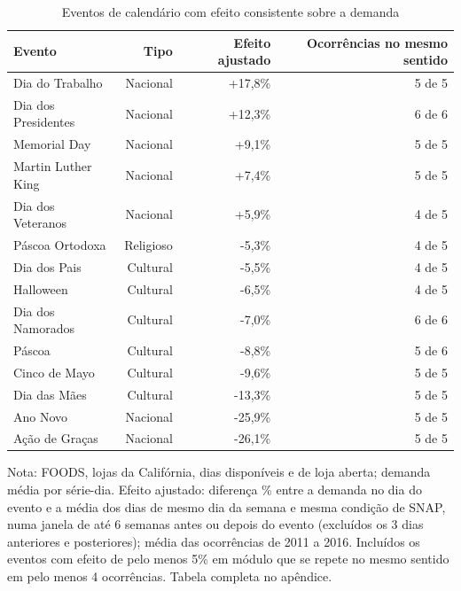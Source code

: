 \begin{table}[htbp]
\centering
\small
\caption{Eventos de calendário com efeito consistente sobre a demanda}
\label{tab:saz_eventos_resumo}
\begin{tabular}{lrrr}
\toprule
Evento & Tipo & Efeito ajustado & Ocorrências no mesmo sentido \\
\midrule
Dia do Trabalho & Nacional & +17,8\% & 5 de 5 \\
Dia dos Presidentes & Nacional & +12,3\% & 6 de 6 \\
Memorial Day & Nacional & +9,1\% & 5 de 5 \\
Martin Luther King & Nacional & +7,4\% & 5 de 5 \\
Dia dos Veteranos & Nacional & +5,9\% & 4 de 5 \\
Páscoa Ortodoxa & Religioso & -5,3\% & 4 de 5 \\
Dia dos Pais & Cultural & -5,5\% & 4 de 5 \\
Halloween & Cultural & -6,5\% & 4 de 5 \\
Dia dos Namorados & Cultural & -7,0\% & 6 de 6 \\
Páscoa & Cultural & -8,8\% & 5 de 6 \\
Cinco de Mayo & Cultural & -9,6\% & 5 de 5 \\
Dia das Mães & Cultural & -13,3\% & 5 de 5 \\
Ano Novo & Nacional & -25,9\% & 5 de 5 \\
Ação de Graças & Nacional & -26,1\% & 5 de 5 \\
\bottomrule
\end{tabular}
\par\smallskip
{\footnotesize Nota: FOODS, lojas da Califórnia, dias disponíveis e de loja aberta; demanda média por série-dia. Efeito ajustado: diferença \% entre a demanda no dia do evento e a média dos dias de mesmo dia da semana e mesma condição de SNAP, numa janela de até 6 semanas antes ou depois do evento (excluídos os 3 dias anteriores e posteriores); média das ocorrências de 2011 a 2016. Incluídos os eventos com efeito de pelo menos 5\% em módulo que se repete no mesmo sentido em pelo menos 4 ocorrências. Tabela completa no apêndice.}
\end{table}
